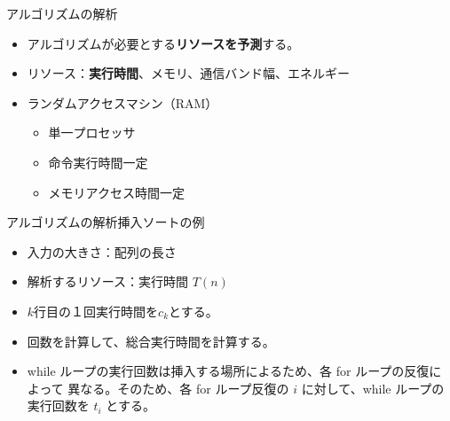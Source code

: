\documentclass[unicode,11pt,aspectratio=169,notes]{beamer} %
\begin{document}

\begin{frame}{アルゴリズムの解析}
  \begin{itemize}
    \item アルゴリズムが必要とする\textbf{リソースを予測}する。
    \item リソース：\textbf{実行時間}、メモリ、通信バンド幅、エネルギー
    \item ランダムアクセスマシン（RAM）
    \begin{itemize}
      \item 単一プロセッサ
      \item 命令実行時間一定
      \item メモリアクセス時間一定
    \end{itemize}
  \end{itemize}
\end{frame}

\begin{frame}{アルゴリズムの解析}{挿入ソートの例}
  \begin{itemize}
    \item 入力の大きさ：配列の長さ
    \item 解析するリソース：実行時間 $T(n)$
    \item $k$行目の１回実行時間を$c_k$とする。
    \item 回数を計算して、総合実行時間を計算する。
    \item while ループの実行回数は挿入する場所によるため、各 for ループの反復によって
    異なる。そのため、各 for ループ反復の $i$ に対して、while ループの実行回数を $t_i$
    とする。
  \end{itemize}
\end{frame}

\end{document}
